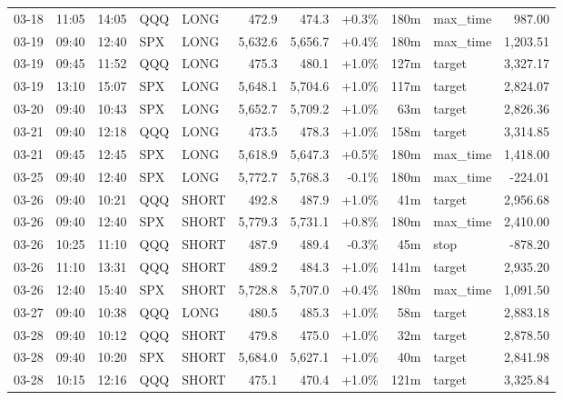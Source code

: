 \documentclass[11pt,a4paper,twoside]{article}
\begin{document}
\begin{center}
\begin{longtable}{>{\color{txtmain}}l l l l l r r r r >{\color{txtmain}}l r}
03-18 & 11:05 & 14:05 & QQQ & LONG & 472.9 & 474.3 & \textcolor{wingreen}{+0.3\%} & 180m & max\_time & \textcolor{wingreen}{987.00} \\
03-19 & 09:40 & 12:40 & SPX & LONG & 5,632.6 & 5,656.7 & \textcolor{wingreen}{+0.4\%} & 180m & max\_time & \textcolor{wingreen}{1,203.51} \\
03-19 & 09:45 & 11:52 & QQQ & LONG & 475.3 & 480.1 & \textcolor{wingreen}{+1.0\%} & 127m & target & \textcolor{wingreen}{3,327.17} \\
03-19 & 13:10 & 15:07 & SPX & LONG & 5,648.1 & 5,704.6 & \textcolor{wingreen}{+1.0\%} & 117m & target & \textcolor{wingreen}{2,824.07} \\
03-20 & 09:40 & 10:43 & SPX & LONG & 5,652.7 & 5,709.2 & \textcolor{wingreen}{+1.0\%} & 63m & target & \textcolor{wingreen}{2,826.36} \\
03-21 & 09:40 & 12:18 & QQQ & LONG & 473.5 & 478.3 & \textcolor{wingreen}{+1.0\%} & 158m & target & \textcolor{wingreen}{3,314.85} \\
03-21 & 09:45 & 12:45 & SPX & LONG & 5,618.9 & 5,647.3 & \textcolor{wingreen}{+0.5\%} & 180m & max\_time & \textcolor{wingreen}{1,418.00} \\
03-25 & 09:40 & 12:40 & SPX & LONG & 5,772.7 & 5,768.3 & \textcolor{lossred}{-0.1\%} & 180m & max\_time & \textcolor{lossred}{-224.01} \\
03-26 & 09:40 & 10:21 & QQQ & SHORT & 492.8 & 487.9 & \textcolor{wingreen}{+1.0\%} & 41m & target & \textcolor{wingreen}{2,956.68} \\
03-26 & 09:40 & 12:40 & SPX & SHORT & 5,779.3 & 5,731.1 & \textcolor{wingreen}{+0.8\%} & 180m & max\_time & \textcolor{wingreen}{2,410.00} \\
03-26 & 10:25 & 11:10 & QQQ & SHORT & 487.9 & 489.4 & \textcolor{lossred}{-0.3\%} & 45m & stop & \textcolor{lossred}{-878.20} \\
03-26 & 11:10 & 13:31 & QQQ & SHORT & 489.2 & 484.3 & \textcolor{wingreen}{+1.0\%} & 141m & target & \textcolor{wingreen}{2,935.20} \\
03-26 & 12:40 & 15:40 & SPX & SHORT & 5,728.8 & 5,707.0 & \textcolor{wingreen}{+0.4\%} & 180m & max\_time & \textcolor{wingreen}{1,091.50} \\
03-27 & 09:40 & 10:38 & QQQ & LONG & 480.5 & 485.3 & \textcolor{wingreen}{+1.0\%} & 58m & target & \textcolor{wingreen}{2,883.18} \\
03-28 & 09:40 & 10:12 & QQQ & SHORT & 479.8 & 475.0 & \textcolor{wingreen}{+1.0\%} & 32m & target & \textcolor{wingreen}{2,878.50} \\
03-28 & 09:40 & 10:20 & SPX & SHORT & 5,684.0 & 5,627.1 & \textcolor{wingreen}{+1.0\%} & 40m & target & \textcolor{wingreen}{2,841.98} \\
03-28 & 10:15 & 12:16 & QQQ & SHORT & 475.1 & 470.4 & \textcolor{wingreen}{+1.0\%} & 121m & target & \textcolor{wingreen}{3,325.84} \\
\end{longtable}
\end{center}
\clearpage
\end{document}
